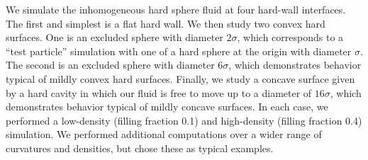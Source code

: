 We simulate the inhomogeneous hard sphere fluid at four hard-wall
interfaces.  The first and simplest is a flat hard wall.  We
then study two convex hard surfaces.  One is an excluded sphere with
diameter $2\sigma$, which corresponds to a ``test particle''
simulation with one of a hard sphere at the origin with diameter
$\sigma$.  The
second is an excluded sphere with diameter $6\sigma$,
which demonstrates behavior typical of mildly convex hard surfaces.
Finally, we study a concave surface given by a hard cavity in which
our fluid is free to move up to a diameter of $16\sigma$, which
demonstrates behavior typical of mildly concave surfaces.  In each
case, we performed a low-density (filling fraction 0.1) and high-density
(filling fraction 0.4) simulation.  We performed additional
computations over a wider range of curvatures and densities, but
chose these as typical examples.



